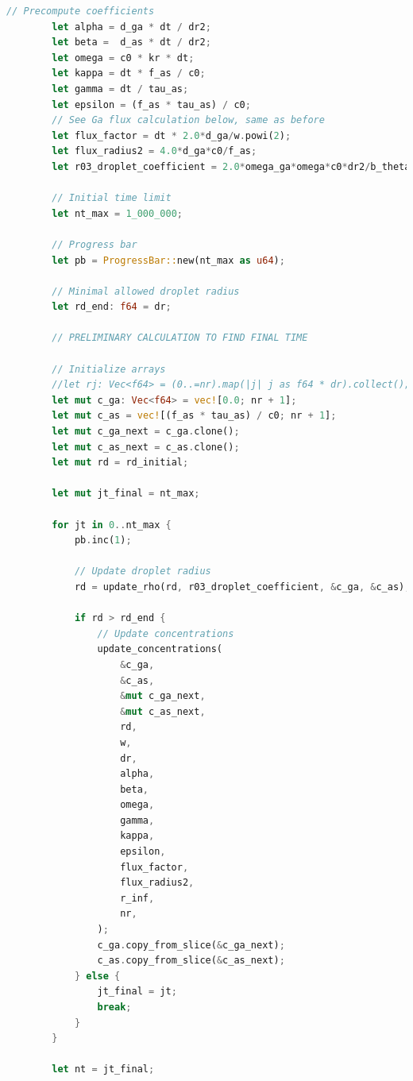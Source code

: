 \documentclass[14pt,oneside]{extarticle}
\begin{document}
\begin{lstlisting}[language=Rust]
        // Precompute coefficients
        let alpha = d_ga * dt / dr2;
        let beta =  d_as * dt / dr2;
        let omega = c0 * kr * dt;
        let kappa = dt * f_as / c0;
        let gamma = dt / tau_as;
        let epsilon = (f_as * tau_as) / c0;
        // See Ga flux calculation below, same as before
        let flux_factor = dt * 2.0*d_ga/w.powi(2);
        let flux_radius2 = 4.0*d_ga*c0/f_as;
        let r03_droplet_coefficient = 2.0*omega_ga*omega*c0*dr2/b_theta;
    
        // Initial time limit
        let nt_max = 1_000_000;
    
        // Progress bar
        let pb = ProgressBar::new(nt_max as u64);
    
        // Minimal allowed droplet radius
        let rd_end: f64 = dr;
    
        // PRELIMINARY CALCULATION TO FIND FINAL TIME
        
        // Initialize arrays
        //let rj: Vec<f64> = (0..=nr).map(|j| j as f64 * dr).collect();
        let mut c_ga: Vec<f64> = vec![0.0; nr + 1];
        let mut c_as = vec![(f_as * tau_as) / c0; nr + 1];
        let mut c_ga_next = c_ga.clone();
        let mut c_as_next = c_as.clone();
        let mut rd = rd_initial;
        
        let mut jt_final = nt_max;
    
        for jt in 0..nt_max {
            pb.inc(1);
    
            // Update droplet radius
            rd = update_rho(rd, r03_droplet_coefficient, &c_ga, &c_as);
    
            if rd > rd_end {
                // Update concentrations
                update_concentrations(
                    &c_ga,
                    &c_as,
                    &mut c_ga_next,
                    &mut c_as_next,
                    rd,
                    w,
                    dr,
                    alpha,
                    beta,
                    omega,
                    gamma,
                    kappa,
                    epsilon,
                    flux_factor,
                    flux_radius2,
                    r_inf,
                    nr,
                );
                c_ga.copy_from_slice(&c_ga_next);
                c_as.copy_from_slice(&c_as_next);
            } else {
                jt_final = jt;
                break;
            }
        }
    
        let nt = jt_final;
    

\end{lstlisting}
\end{document}
